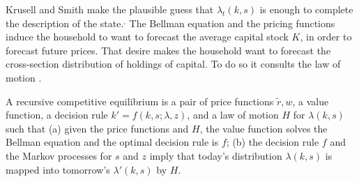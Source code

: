 Krusell and Smith make the plausible guess that $\lambda_t(k,s)$
is enough to complete the description of the state.$^,$
The Bellman equation and the pricing functions induce the
household to want to forecast the average capital stock $K$,
in order to forecast future prices.  That desire makes the household want
to forecast the cross-section distribution of holdings of
capital. To do so it consults the law of motion .

\medskip
\medskip{}  A recursive competitive equilibrium is
a pair of price functions $\tilde r, w$, a  value function,
a decision rule $k'=f(k,s;\lambda,z)$, and a law of motion $H$
for $\lambda(k,s)$ such that
\medskip
\noindent (a) given the price functions
and $H$, the value function solves the Bellman equation  and
the optimal  decision rule  is $f$;
\medskip
\noindent (b) the decision rule $f$ and the
Markov processes for $s$ and $z$ imply that today's distribution
$\lambda(k,s)$ is mapped into tomorrow's  $\lambda'(k,s)$ by $H$.

\medskip

